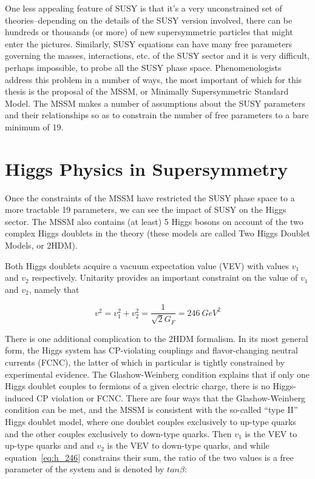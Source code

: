 One less appealing feature of SUSY is that it's a very unconstrained set of theories--depending on the details of the SUSY version involved, there can be hundreds or thousands (or more) of new supersymmetric particles that might enter the pictures.  Similarly, SUSY equations can have many free parameters governing the masses, interactions, etc. of the SUSY sector and it is very difficult, perhaps impossible, to probe all the SUSY phase space.  Phenomenologists address this problem in a number of ways, the most important of which for this thesis is the proposal of the MSSM, or Minimally Supersymmetric Standard Model.  The MSSM makes a number of assumptions about the SUSY parameters and their relationships so as to constrain the number of free parameters to a bare minimum of 19.  

\section{Higgs Physics in Supersymmetry}
\label{sec:SUSY_Higgs}
Once the constraints of the MSSM have restricted the SUSY phase space to a more tractable 19 parameters, we can see the impact of SUSY on the Higgs sector.  The MSSM also contains (at least) 5 Higgs bosons on account of the two complex Higgs doublets in the theory (these models are called Two Higgs Doublet Models, or 2HDM).  



Both Higgs doublets acquire a vacuum expectation value (VEV) with values $v_1$ and $v_2$ respectively.  Unitarity provides an important constraint on the value of $v_1$ and $v_2$, namely that 

\begin{equation}
	v^2 = v_1^2 + v_2^2 = \frac{1}{\sqrt{2}G_F} = 246\ GeV^2
	\label{eq:h_246}
\end{equation}


There is one additional complication to the 2HDM formalism.  In its most general form, the Higgs system has CP-violating couplings and flavor-changing neutral currents (FCNC), the latter of which in particular is tightly constrained by experimental evidence.  The Glashow-Weinberg condition explains that if only one Higgs doublet couples to fermions of a given electric charge, there is no Higgs-induced CP violation or FCNC.  There are four ways that the Glashow-Weinberg condition can be met, and the MSSM is consistent with the so-called ``type II'' Higgs doublet model, where one doublet couples exclusively to up-type quarks and the other couples exclusively to down-type quarks.  Then $v_1$ is the VEV to up-type quarks and and $v_2$ is the VEV to down-type quarks, and while equation~\ref{eq:h_246} constrains their sum, the ratio of the two values is a free parameter of the system and is denoted by $tan\beta$:

